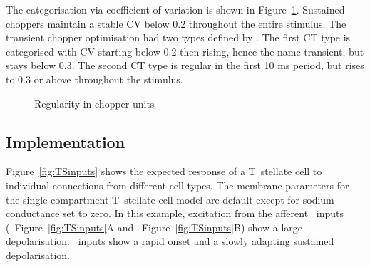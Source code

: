                        
The categorisation via coefficient of variation is shown in Figure~\ref{fig:PaoliniCVdata}. 
Sustained choppers maintain a stable CV below 0.2 throughout the entire stimulus. The transient chopper optimisation had two types defined by \citep{PaoliniClareyEtAl:2005}.
The first CT type is categorised with CV starting below 0.2 then rising, hence the name transient, but stays below 0.3.
The second CT type is regular in the first 10 ms period, but rises to 0.3 or above throughout the stimulus.

\begin{figure}[htb]
  \centering
  \caption{Regularity in chopper units \citep[Data reproduced from Fig.~2,~][]{PaoliniClareyEtAl:2005}}
  \label{fig:PaoliniCVdata}
\end{figure}





\subsection{Implementation}





  
Figure~\ref{fig:TSinputs} shows the expected response of a T~stellate cell to individual connections from different cell types. 
The membrane parameters for the single compartment T~stellate cell model are default except for sodium conductance set to zero.
In this example, excitation from the afferent \ANF~inputs (\LSR~Figure~\ref{fig:TSinputs}A and \HSR~Figure~\ref{fig:TSinputs}B) show a large depolarisation.
\HSR~inputs show a rapid onset and a slowly adapting sustained depolarisation.






